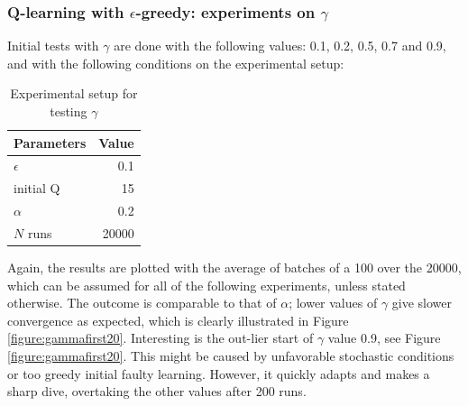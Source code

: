 \documentclass[paper=a4, fontsize=11pt]{scrartcl}
\numberwithin{equation}{section}		%
\numberwithin{figure}{section}			%
\numberwithin{table}{section}				%
\begin{document}
\subsubsection*{Q-learning with $\epsilon$-greedy: experiments on $\gamma$}
Initial tests with $\gamma$ are done with the following values: 0.1, 0.2, 0.5, 0.7 and 0.9, and with the following conditions on the experimental setup:
\begin{table}[H]
\caption{Experimental setup for testing $\gamma$}
\centering
\begin{tabular}{|l|r|}
\hline
Parameters & Value \\\hline
$\epsilon$ & 0.1 \\\hline
initial Q & 15 \\\hline
$\alpha$ & 0.2\\\hline
$N$ runs & 20000\\\hline
\end{tabular}
\label{expSetupGamma}
\end{table}
Again, the results are plotted with the average of batches of a 100 over the 20000, which can be assumed for all of the following experiments, unless stated otherwise. The outcome is comparable to that of $\alpha$; lower values of $\gamma$ give slower convergence as expected, which is clearly illustrated in Figure \ref{figure:gammafirst20}. Interesting is the out-lier start of $\gamma$ value 0.9, see Figure \ref{figure:gammafirst20}. This might be caused by unfavorable stochastic conditions or too greedy initial faulty learning. However, it quickly adapts and makes a sharp dive, overtaking the other values after 200 runs.
\end{document}
